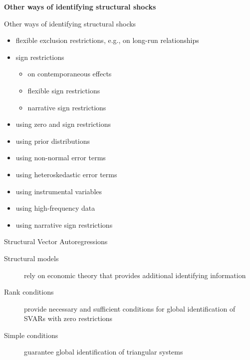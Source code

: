 \documentclass[notes,blackandwhite,mathsans,usenames,dvipsnames]{beamer}
\begin{document}
{
\begin{frame}

\begin{adjustwidth}{-0.5cm}{0cm}
\vspace{8.3cm}\Large
\textbf{{\color{mcxs5}Other ways of} {\color{mcxs1} identifying structural shocks}}
\end{adjustwidth}

\end{frame}
}



\begin{frame}{Other ways of identifying structural shocks}

\begin{itemize}[label=\textbullet,leftmargin = *]
\item {\color{purple}flexible exclusion restrictions, e.g., on long-run relationships}
\item {\color{purple}sign restrictions}
	\begin{itemize}[label=\textbullet,leftmargin = 0.9cm]
	\item {\color{purple}on contemporaneous effects}
	\item {\color{purple}flexible sign restrictions}
	\item {\color{purple}narrative sign restrictions}
	\end{itemize}
\item {\color{mcxs2}using zero and sign restrictions}
\item {\color{mcxs2}using prior distributions}
\item {\color{mcxs2}using non-normal error terms}
\item {\color{purple}using heteroskedastic error terms}
\item {\color{mcxs2}using instrumental variables}
\item {\color{mcxs2}using high-frequency data}
\item {\color{mcxs2}using narrative sign restrictions}
\end{itemize}

\end{frame}




{
\begin{frame}{{\color{white}Structural Vector Autoregressions}}
\begin{description}
\item[Structural models] {\color{mcxs5}rely on economic theory that provides additional identifying information}

\bigskip\item[Rank conditions] {\color{mcxs5}provide necessary and sufficient conditions for global identification of SVARs with zero restrictions}

\bigskip\item[Simple conditions] {\color{mcxs5}guarantee global identification of triangular systems}
\end{description}
\end{frame}
}
\end{document}
